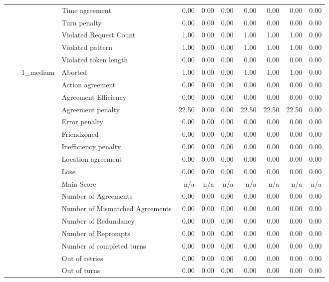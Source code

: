 \begin{tabular}{llllrrrrrrr}
 &  &  & Time agreement & 0.00 & 0.00 & 0.00 & 0.00 & 0.00 & 0.00 & 0.00 \\
 &  &  & Turn penalty & 0.00 & 0.00 & 0.00 & 0.00 & 0.00 & 0.00 & 0.00 \\
 &  &  & Violated Request Count & 1.00 & 0.00 & 0.00 & 1.00 & 1.00 & 1.00 & 0.00 \\
 &  &  & Violated pattern & 1.00 & 0.00 & 0.00 & 1.00 & 1.00 & 1.00 & 0.00 \\
 &  &  & Violated token length & 0.00 & 0.00 & 0.00 & 0.00 & 0.00 & 0.00 & 0.00 \\
\cline{3-11}
 &  & \multirow[t]{27}{*}{1_medium} & Aborted & 1.00 & 0.00 & 0.00 & 1.00 & 1.00 & 1.00 & 0.00 \\
 &  &  & Action agreement & 0.00 & 0.00 & 0.00 & 0.00 & 0.00 & 0.00 & 0.00 \\
 &  &  & Agreement Efficiency & 0.00 & 0.00 & 0.00 & 0.00 & 0.00 & 0.00 & 0.00 \\
 &  &  & Agreement penalty & 22.50 & 0.00 & 0.00 & 22.50 & 22.50 & 22.50 & 0.00 \\
 &  &  & Error penalty & 0.00 & 0.00 & 0.00 & 0.00 & 0.00 & 0.00 & 0.00 \\
 &  &  & Friendzoned & 0.00 & 0.00 & 0.00 & 0.00 & 0.00 & 0.00 & 0.00 \\
 &  &  & Inefficiency penalty & 0.00 & 0.00 & 0.00 & 0.00 & 0.00 & 0.00 & 0.00 \\
 &  &  & Location agreement & 0.00 & 0.00 & 0.00 & 0.00 & 0.00 & 0.00 & 0.00 \\
 &  &  & Lose & 0.00 & 0.00 & 0.00 & 0.00 & 0.00 & 0.00 & 0.00 \\
 &  &  & Main Score & n/a & n/a & n/a & n/a & n/a & n/a & n/a \\
 &  &  & Number of Agreements & 0.00 & 0.00 & 0.00 & 0.00 & 0.00 & 0.00 & 0.00 \\
 &  &  & Number of Mismatched Agreements & 0.00 & 0.00 & 0.00 & 0.00 & 0.00 & 0.00 & 0.00 \\
 &  &  & Number of Redundancy & 0.00 & 0.00 & 0.00 & 0.00 & 0.00 & 0.00 & 0.00 \\
 &  &  & Number of Reprompts & 0.00 & 0.00 & 0.00 & 0.00 & 0.00 & 0.00 & 0.00 \\
 &  &  & Number of completed turns & 0.00 & 0.00 & 0.00 & 0.00 & 0.00 & 0.00 & 0.00 \\
 &  &  & Out of retries & 0.00 & 0.00 & 0.00 & 0.00 & 0.00 & 0.00 & 0.00 \\
 &  &  & Out of turns & 0.00 & 0.00 & 0.00 & 0.00 & 0.00 & 0.00 & 0.00 \\

\end{tabular}
